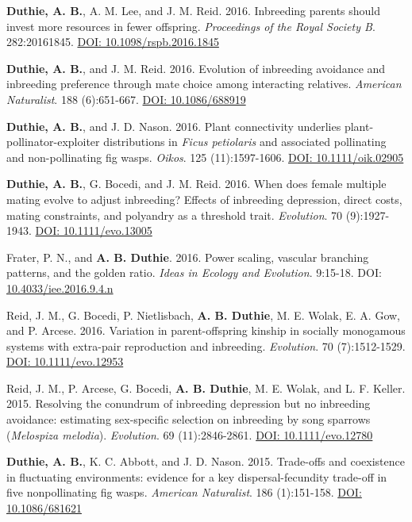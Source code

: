 \documentclass[letterpaper]{article}
\begin{document}
\begin{etaremune}
\item {\bf Duthie, A. B.}, A. M. Lee, and J. M. Reid. 2016. Inbreeding parents should invest more resources in fewer offspring. {\it Proceedings of the Royal Society B}. 282:20161845. \href{http://rspb.royalsocietypublishing.org/content/283/1843/20161845}{DOI: 10.1098/rspb.2016.1845}
\item {\bf Duthie, A. B.}, and J. M. Reid. 2016. Evolution of inbreeding avoidance and inbreeding preference through mate choice among interacting relatives. {\it American Naturalist}. 188 (6):651-667. \href{http://www.journals.uchicago.edu/doi/full/10.1086/688919}{DOI: 10.1086/688919}
\item {\bf Duthie, A. B.}, and J. D. Nason. 2016. Plant connectivity underlies plant-pollinator-exploiter distributions in {\it Ficus petiolaris} and associated pollinating and non-pollinating fig wasps. {\it Oikos}. 125 (11):1597-1606. \href{http://onlinelibrary.wiley.com/doi/10.1111/oik.02905/abstract}{DOI: 10.1111/oik.02905}
\item {\bf Duthie, A. B.}, G. Bocedi, and J. M. Reid. 2016. When does female multiple mating evolve to adjust inbreeding? Effects of inbreeding depression, direct costs, mating constraints, and polyandry as a threshold trait. {\it Evolution}. 70 (9):1927-1943. \href{http://onlinelibrary.wiley.com/doi/10.1111/evo.13005/abstract}{DOI: 10.1111/evo.13005}
\item Frater, P. N., and {\bf A. B. Duthie}. 2016. Power scaling, vascular branching patterns, and the golden ratio. {\it Ideas in Ecology and Evolution}. 9:15-18. DOI: \href{http://ojs.library.queensu.ca/index.php/IEE/article/view/6312}{10.4033/iee.2016.9.4.n}
\item Reid, J. M., G. Bocedi, P. Nietlisbach, {\bf A. B. Duthie}, M. E. Wolak, E. A. Gow, and P. Arcese. 2016. Variation in parent-offspring kinship in socially monogamous systems with extra-pair reproduction and inbreeding. {\it Evolution}. 70 (7):1512-1529. \href{http://onlinelibrary.wiley.com/doi/10.1111/evo.12953/abstract}{DOI: 10.1111/evo.12953}
\item Reid, J. M., P. Arcese, G. Bocedi, {\bf A. B. Duthie}, M. E. Wolak, and L. F. Keller. 2015. Resolving the conundrum of inbreeding depression but no inbreeding avoidance: estimating sex-specific selection on inbreeding by song sparrows ({\it Melospiza melodia}). {\it Evolution}. 69 (11):2846-2861. \href{http://onlinelibrary.wiley.com/doi/10.1111/evo.12780/abstract}{DOI: 10.1111/evo.12780}
\item {\bf Duthie, A. B.}, K. C. Abbott, and J. D. Nason. 2015. Trade-offs and coexistence in fluctuating environments: evidence for a key dispersal-fecundity trade-off in five nonpollinating fig wasps. {\it American Naturalist}. 186 (1):151-158. \href{http://www.jstor.org/stable/10.1086/681621}{DOI: 10.1086/681621}

\end{etaremune}
\end{document}
